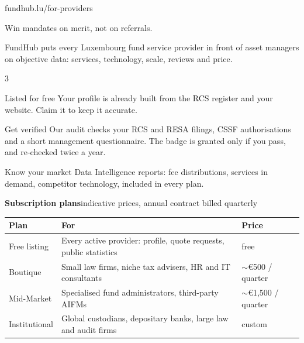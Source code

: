 \documentclass[10pt,a4paper]{article}
\begin{document}
\begin{fhdark}
  {\fontsize{28}{32}\selectfont\fundhublight}\hfill{\small\textcolor{fhEmerald}{fundhub.lu/for-providers}}\par\vspace{4pt}
  {\Large Win mandates on merit, not on referrals.}\par\vspace{4pt}
  {\small\textcolor{fhLine}{FundHub puts every Luxembourg fund service provider in front of asset managers on objective data: services, technology, scale, reviews and price.}}
\end{fhdark}

\begin{multicols}{3}
\begin{fhpanel}{Listed for free}
  Your profile is already built from the RCS register and your website. Claim it to keep it accurate.
\end{fhpanel}
\begin{fhpanel}{Get verified}
  Our audit checks your RCS and RESA filings, CSSF authorisations and a short management questionnaire. The badge is granted only if you pass, and re-checked twice a year.
\end{fhpanel}
\begin{fhpanel}{Know your market}
  Data Intelligence reports: fee distributions, services in demand, competitor technology, included in every plan.
\end{fhpanel}
\end{multicols}

{\large\bfseries Subscription plans}\hfill{\scriptsize\textcolor{fhSlate}{indicative prices, annual contract billed quarterly}}

\small
\begin{tabularx}{\textwidth}{@{}l X l@{}}
  \toprule
  \textbf{Plan} & \textbf{For} & \textbf{Price} \\
  \midrule
  Free listing & Every active provider: profile, quote requests, public statistics & free \\
  Boutique & Small law firms, niche tax advisers, HR and IT consultants & $\sim$\euro{}500 / quarter \\
  Mid-Market & Specialised fund administrators, third-party AIFMs & $\sim$\euro{}1,500 / quarter \\
  Institutional & Global custodians, depositary banks, large law and audit firms & custom \\
  \bottomrule
\end{tabularx}
\normalsize
\end{document}
